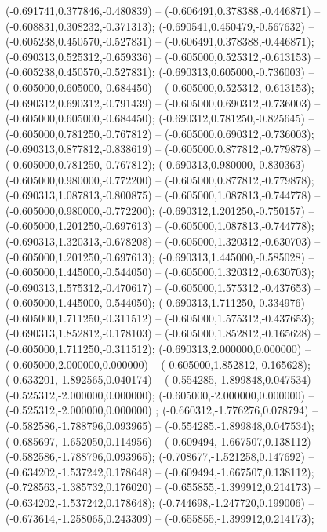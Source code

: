  (-0.691741,0.377846,-0.480839) -- (-0.606491,0.378388,-0.446871) -- (-0.608831,0.308232,-0.371313);
 (-0.690541,0.450479,-0.567632) -- (-0.605238,0.450570,-0.527831) -- (-0.606491,0.378388,-0.446871);
 (-0.690313,0.525312,-0.659336) -- (-0.605000,0.525312,-0.613153) -- (-0.605238,0.450570,-0.527831);
 (-0.690313,0.605000,-0.736003) -- (-0.605000,0.605000,-0.684450) -- (-0.605000,0.525312,-0.613153);
 (-0.690312,0.690312,-0.791439) -- (-0.605000,0.690312,-0.736003) -- (-0.605000,0.605000,-0.684450);
 (-0.690312,0.781250,-0.825645) -- (-0.605000,0.781250,-0.767812) -- (-0.605000,0.690312,-0.736003);
 (-0.690313,0.877812,-0.838619) -- (-0.605000,0.877812,-0.779878) -- (-0.605000,0.781250,-0.767812);
 (-0.690313,0.980000,-0.830363) -- (-0.605000,0.980000,-0.772200) -- (-0.605000,0.877812,-0.779878);
 (-0.690313,1.087813,-0.800875) -- (-0.605000,1.087813,-0.744778) -- (-0.605000,0.980000,-0.772200);
 (-0.690312,1.201250,-0.750157) -- (-0.605000,1.201250,-0.697613) -- (-0.605000,1.087813,-0.744778);
 (-0.690313,1.320313,-0.678208) -- (-0.605000,1.320312,-0.630703) -- (-0.605000,1.201250,-0.697613);
 (-0.690313,1.445000,-0.585028) -- (-0.605000,1.445000,-0.544050) -- (-0.605000,1.320312,-0.630703);
 (-0.690313,1.575312,-0.470617) -- (-0.605000,1.575312,-0.437653) -- (-0.605000,1.445000,-0.544050);
 (-0.690313,1.711250,-0.334976) -- (-0.605000,1.711250,-0.311512) -- (-0.605000,1.575312,-0.437653);
 (-0.690313,1.852812,-0.178103) -- (-0.605000,1.852812,-0.165628) -- (-0.605000,1.711250,-0.311512);
 (-0.690313,2.000000,0.000000) -- (-0.605000,2.000000,0.000000) -- (-0.605000,1.852812,-0.165628);
 (-0.633201,-1.892565,0.040174) -- (-0.554285,-1.899848,0.047534) -- (-0.525312,-2.000000,0.000000);
 (-0.605000,-2.000000,0.000000) -- (-0.525312,-2.000000,0.000000) ;
 (-0.660312,-1.776276,0.078794) -- (-0.582586,-1.788796,0.093965) -- (-0.554285,-1.899848,0.047534);
 (-0.685697,-1.652050,0.114956) -- (-0.609494,-1.667507,0.138112) -- (-0.582586,-1.788796,0.093965);
 (-0.708677,-1.521258,0.147692) -- (-0.634202,-1.537242,0.178648) -- (-0.609494,-1.667507,0.138112);
 (-0.728563,-1.385732,0.176020) -- (-0.655855,-1.399912,0.214173) -- (-0.634202,-1.537242,0.178648);
 (-0.744698,-1.247720,0.199006) -- (-0.673614,-1.258065,0.243309) -- (-0.655855,-1.399912,0.214173);
